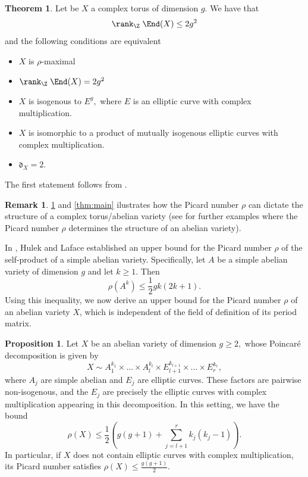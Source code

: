\documentclass[11pt,leqno]{article}
\theoremstyle{definition}
\newtheorem{theorem}{Theorem}[section]
\newtheorem{proposition}{Proposition}[section]
\newtheorem{remark}{Remark}[section]
\begin{document}
\begin{theorem}
\label{theorem:max}
Let be $X$ a complex torus of dimension $g.$ We have that
$$
\rank_{\Z}\; \End (X)\leq 2g^2
$$
and the following conditions are equivalent
\begin{itemize}
    \item[(i)] $X$ is $\rho$-maximal
    \item[(ii)] $\rank_{\Z}\; \End (X)= 2g^2$
    \item[(iii)] $X$ is isogenous to $E^g,$ where $E$ is an elliptic curve with complex multiplication. 
    \item[(iv)] $X$ is isomorphic to a product of mutually isogenous elliptic curves with complex multiplication. 
    \item[(v)] $\mathfrak{d}_X=2.$
\end{itemize}
\end{theorem}

The first statement follows from \cite[Theorem 1-1]{shimizu}.

\begin{remark}
\cref{theorem:max} and \cref{thm:main} ilustrates how the Picard number $\rho$ can dictate the structure of a complex torus/abelian variety (see  \cite{hulek2019picard} for further examples where the Picard number $\rho$ determines the structure of an abelian variety).
\end{remark}




In \cite[Corollary 2.5]{hulek2019picard}, Hulek and Laface established an upper bound for the Picard number $\rho$ of the self-product of a simple abelian variety. Specifically, let $A$ be a simple abelian variety of dimension $g$ and let $k\geq 1.$ Then
\begin{equation}
\label{eq:1102}
\rho(A^k)\leq \frac{1}{2}gk(2k+1).
\end{equation}
Using this inequality, we now derive an upper bound for the Picard number $\rho$ of an abelian variety $X$, which is independent of the field of definition of its period matrix. 


\begin{proposition} 
\label{prop:1303}
Let $X$ be an abelian variety of dimension $g\geq 2,$ whose Poincaré decomposition is given by
    \begin{equation*}
        X\sim A_1^{k_1}\times\dots\times A_l^{k_l}\times E_{l+1}^{k_{l+1}}\times\dots\times E_{r}^{k_r},
    \end{equation*}
where $A_j$ are simple abelian and $E_j$ are elliptic curves. These factors are pairwise non-isogenous, and the $E_j$ are precisely the elliptic curves with complex multiplication appearing in this decomposition. In this setting, we have the bound
$$
\rho(X)\leq \frac{1}{2}\left(g(g+1)+\sum_{j=l+1}^{r}k_j(k_j-1) \right).
$$
In particular, if $X$ does not contain elliptic curves with complex multiplication, its Picard number satisfies $\rho(X)\leq\frac{g(g+1)}{2}$.
\end{proposition}
\end{document}
